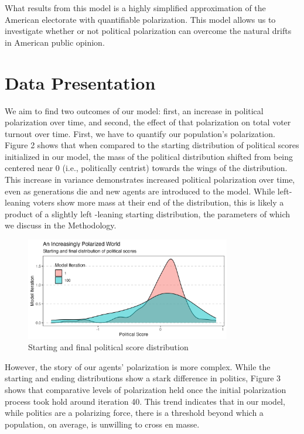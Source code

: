\documentclass[titlepage, 12pt, leqno]{article} %
\begin{document}
What results from this model is a highly simplified approximation of the
American electorate with quantifiable polarization. This model allows us to
investigate whether or not political polarization can overcome the natural 
drifts in American public opinion. 

\section{Data Presentation}
We aim to find two outcomes of our model: first, an increase in political
polarization over time, and second, the effect of that polarization on total
voter turnout over time. First, we have to quantify our population's
polarization. Figure 2 shows that when compared to the starting distribution of
political scores initialized in our model, the mass of the political 
distribution shifted from being centered near 0 (i.e., politically centrist)
towards the wings of the distribution. This increase in variance demonstrates
increased political polarization over time, even as generations die and new
agents are introduced to the model. While left-leaning voters show more mass at
their end of the distribution, this is likely a product of a slightly left
-leaning starting distribution, the parameters of which we discuss in the
Methodology.

\begin{figure}[ht]
    \centering
    \includegraphics[width=0.8\textwidth]{../plots/polarization_change.png}
    \caption{Starting and final political score distribution}
\end{figure}

However, the story of our agents' polarization is more complex. While the
starting and ending distributions show a stark difference in politics, Figure 3
shows that comparative levels of polarization held once the initial 
polarization process took hold around iteration 40. This trend indicates that
in our model, while politics are a polarizing force, there is a threshold beyond
which a population, on average, is unwilling to cross en masse.
\end{document}
